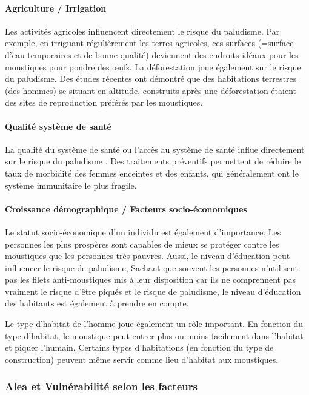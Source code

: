 \paragraph{Agriculture / Irrigation}

Les activités agricoles influencent directement le risque du paludisme. Par exemple, en irriguant régulièrement les terres agricoles, ces surfaces (=surface d'eau temporaires et de bonne qualité) deviennent des endroits idéaux pour les moustiques pour pondre des œufs. La déforestation joue également sur le risque du paludisme. Des études récentes ont démontré que des habitations terrestres (des hommes) se situant en altitude, construits après une déforestation étaient des sites de reproduction préférés par les moustiques.\citep{Krefis2011}

\paragraph{Qualité système de santé}

La qualité du système de santé ou l'accès au système de santé influe directement sur le risque du paludisme  \citep{Protopopoff2009}. Des traitements préventifs permettent de réduire le taux de morbidité des femmes enceintes et des enfants, qui généralement ont le système immunitaire le plus fragile.


\paragraph{Croissance démographique / Facteurs socio-économiques}

Le statut socio-économique d'un individu est également d'importance. Les personnes les plus prospères sont capables de mieux se protéger contre les moustiques que les personnes très pauvres. Aussi, le niveau d'éducation peut influencer le risque de paludisme, Sachant que souvent les  personnes n'utilisent pas les filets anti-moustiques mis à leur disposition car ils ne comprennent pas vraiment le risque d'être piqués et le risque de paludisme, le niveau d'éducation des habitants est  également à prendre en compte.

Le type d'habitat de l'homme joue également un rôle important. En fonction du type d'habitat, le moustique peut entrer plus ou moins facilement dans l'habitat et piquer l'humain. Certains types d'habitations (en fonction du type de construction) peuvent même servir comme lieu d'habitat aux moustiques.


\subsubsection{Alea et Vulnérabilité selon les facteurs}

